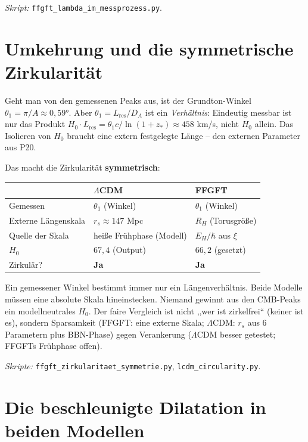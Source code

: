 \emph{Skript:} \texttt{ffgft\_lambda\_im\_messprozess.py}.

\section{Umkehrung und die symmetrische Zirkularität}

Geht man von den gemessenen Peaks aus, ist der Grundton-Winkel
$\theta_1 = \pi/A \approx 0{,}59°$. Aber $\theta_1 = L_\mathrm{res}/D_A$ ist
ein \emph{Verhältnis}: Eindeutig messbar ist nur das Produkt
$H_0 \cdot L_\mathrm{res} = \theta_1 c/\ln(1+z_*) \approx 458$ km/s, nicht
$H_0$ allein. Das Isolieren von $H_0$ braucht eine extern festgelegte Länge --
den externen Parameter aus P20.

Das macht die Zirkularität \textbf{symmetrisch}:
\begin{center}
\begin{tabular}{p{3.5cm}p{4cm}p{4cm}}
\toprule
 & \textbf{$\Lambda$CDM} & \textbf{FFGFT} \\
\midrule
Gemessen & $\theta_1$ (Winkel) & $\theta_1$ (Winkel) \\
Externe Längenskala & $r_s \approx 147$ Mpc & $R_H$ (Torusgröße) \\
Quelle der Skala & heiße Frühphase (Modell) & $E_H/\hbar$ aus $\xi$ \\
$H_0$ & $67{,}4$ (Output) & $66{,}2$ (gesetzt) \\
Zirkulär? & \textbf{Ja} & \textbf{Ja} \\
\bottomrule
\end{tabular}
\end{center}

Ein gemessener Winkel bestimmt immer nur ein Längenverhältnis. Beide Modelle
müssen eine absolute Skala hineinstecken. Niemand gewinnt aus den CMB-Peaks
ein modellneutrales $H_0$. Der faire Vergleich ist nicht ,,wer ist
zirkelfrei`` (keiner ist es), sondern Sparsamkeit (FFGFT: eine externe Skala;
$\Lambda$CDM: $r_s$ aus 6 Parametern plus BBN-Phase) gegen Verankerung
($\Lambda$CDM besser getestet; FFGFTs Frühphase offen).

\emph{Skripte:} \texttt{ffgft\_zirkularitaet\_symmetrie.py},
\texttt{lcdm\_circularity.py}.


\section{Die beschleunigte Dilatation in beiden Modellen}

